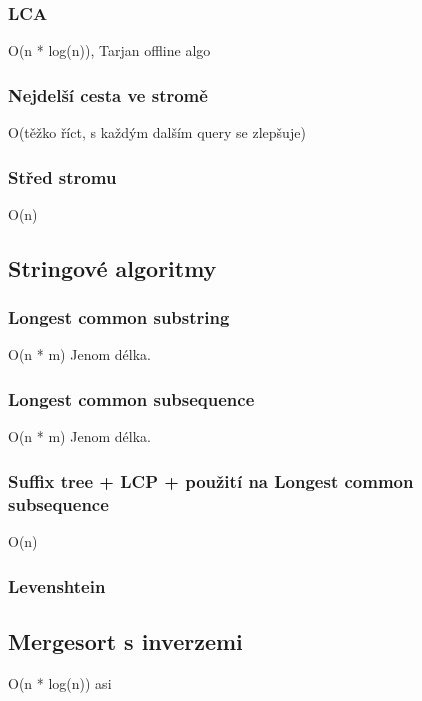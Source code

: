 \documentclass[10pt, a4paper]{article}
\begin{document}
\subsubsection{LCA}
O(n * log(n)), Tarjan offline algo


\subsubsection{Nejdelší cesta ve stromě}
O(těžko říct, s každým dalším query se zlepšuje)


\subsubsection{Střed stromu}
O(n)



\subsection{Stringové algoritmy}
\subsubsection{Longest common substring}
O(n * m)
Jenom délka.


\subsubsection{Longest common subsequence}
O(n * m)
Jenom délka.


\subsubsection{Suffix tree + LCP + použití na Longest common subsequence}
O(n)


\subsubsection{Levenshtein}


\subsection{Mergesort s inverzemi}
O(n * log(n)) asi

\end{document}
